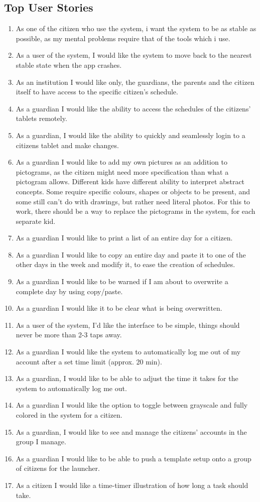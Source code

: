 \subsection{Top User Stories}
\begin{enumerate}
  \item As one of the citizen who use the system, i want the system to be as
stable as possible, as my mental problems require that of the tools which i use.
  \item As a user of the system, I would like the system to move back to the
nearest stable state when the app crashes.
  \item As an institution I would like only, the guardians, the parents and the
citizen itself to have access to the specific citizen’s schedule.
  \item As a guardian I would like the ability to access the schedules of the
citizens’ tablets remotely.
  \item As a guardian, I would like the ability to quickly and seamlessly login
to a citizens tablet and make changes.
  \item As a guardian I would like to add my own pictures as an addition to
pictograms, as the citizen might need more specification than what a pictogram allows.
		Different kids have different ability to interpret abstract concepts.
		Some require specific colours, shapes or objects to be present, 
		and some still can’t do with drawings, but rather need literal photos.
		For this to work, there should be a way to replace the pictograms in the 
		system, for each separate kid.
  \item As a guardian I would like to print a list of an entire day for a
citizen.
  \item As a guardian I would like to copy an entire day and paste it to one of
the other days in the week and modify it, to ease the creation of schedules.
  \item As a guardian I would like to be warned if I am about to overwrite a
complete day by using copy/paste.
  \item As a guardian I would like it to be clear what is being overwritten.
  \item As a user of the system, I’d like the interface to be simple, things
should never be more than 2-3 taps away.
  \item As a guardian I would like the system to automatically log me out of my
account after a set time limit (approx. 20 min).
  \item As a guardian, I would like to be able to adjust the time it takes for
the system to automatically log me out.
  \item As a guardian I would like the option to toggle between grayscale and
fully colored in the system for a citizen.
  \item As a guardian, I would like to see and manage the citizens’ accounts in
the group I manage.
  \item As a guardian I would like to be able to push a template setup onto a
group of citizens for the launcher.
  \item As a citizen I would like a time-timer illustration of how long a task
should take.
\end{enumerate}

